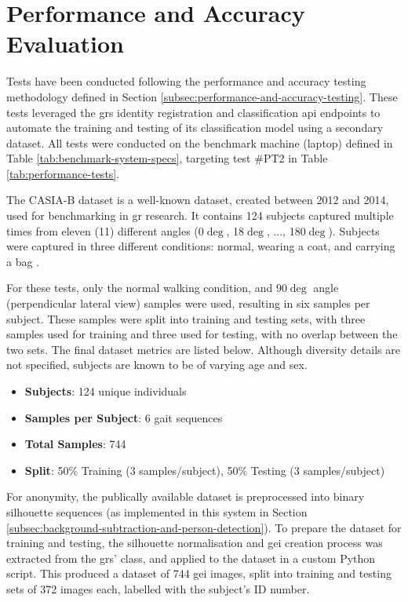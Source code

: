 \section{Performance and Accuracy Evaluation}
\label{sec:performance-evaluation}

Tests have been conducted following the performance and accuracy testing methodology defined in Section \ref{subsec:performance-and-accuracy-testing}.
These tests leveraged the \ac{grs} identity registration and classification \ac{api} endpoints to automate the training and testing of its classification model using a secondary dataset.
All tests were conducted on the benchmark machine (laptop) defined in Table \ref{tab:benchmark-system-specs}, targeting test \#PT2 in Table \ref{tab:performance-tests}.

The CASIA-B dataset is a well-known dataset, created between 2012 and 2014, used for benchmarking in \ac{gr} research.
It contains 124 subjects captured multiple times from eleven (11) different angles (0$\deg$, 18$\deg$, ..., 180$\deg$).
Subjects were captured in three different conditions: normal, wearing a coat, and carrying a bag \parencite{fuCASIABPoseCASIABPose2023}.

For these tests, only the normal walking condition, and 90$\deg$ angle (perpendicular lateral view) samples were used, resulting in six samples per subject.
These samples were split into training and testing sets, with three samples used for training and three used for testing, with no overlap between the two sets.
The final dataset metrics are listed below.
Although diversity details are not specified, subjects are known to be of varying age and sex.

\begin{itemize}
    \item \textbf{Subjects}: 124 unique individuals
    \item \textbf{Samples per Subject}: 6 gait sequences
    \item \textbf{Total Samples}: 744
    \item \textbf{Split}: 50\% Training (3 samples/subject), 50\% Testing (3 samples/subject)
\end{itemize}

For anonymity, the publically available dataset is preprocessed into binary silhouette sequences (as implemented in this system in Section \ref{subsec:background-subtraction-and-person-detection}).
To prepare the dataset for training and testing, the silhouette normalisation and \ac{gei} creation process was extracted from the \ac{grs}'  class, and applied to the dataset in a custom Python script.
This produced a dataset of 744 \ac{gei} images, split into training and testing sets of 372 images each, labelled with the subject's ID number.

